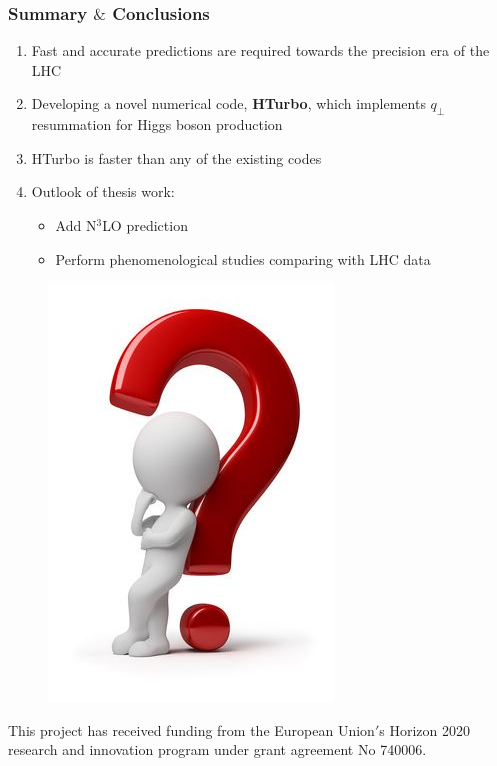 \documentclass[aspectratio=43]{beamer}
\begin{document}
\begin{frame}
	
	\frametitle{Summary $\&$ Conclusions}

	\vspace{2.0 cm}
	
	\begin{enumerate}
		\item Fast and accurate predictions are required towards the precision era of the LHC
		\item Developing a novel numerical code, \textbf{HTurbo}, which implements $q_{\perp}$ resummation for Higgs boson production
		\item HTurbo is {\color{blue} faster than any of the existing codes}
		\item Outlook of thesis work: 
		\begin{itemize}
			\item Add {\color{blue}N$^{3}$LO} prediction
			\item Perform phenomenological studies comparing with LHC data
		\end{itemize}

	\end{enumerate}

	\vspace{2.0 cm}

\end{frame}

\begin{frame}


	\begin{figure}
		\includegraphics[width = 4 cm]{plots/thinking.png}
	\end{figure}		

	{\small \color{blue} This project has received funding from the European Union$'$s Horizon 2020 research and innovation program under grant agreement No 740006.}

\end{frame}
\end{document}
